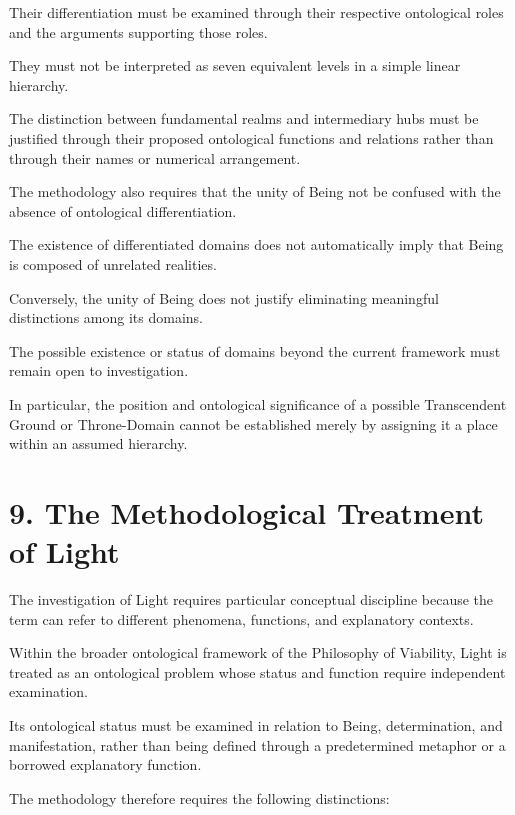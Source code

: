 Their differentiation must be
examined through their respective
ontological roles and the arguments
supporting those roles.

They must not be interpreted
as seven equivalent levels
in a simple linear hierarchy.

The distinction between fundamental
realms and intermediary hubs
must be justified through their
proposed ontological functions
and relations rather than through
their names or numerical arrangement.

The methodology also requires
that the unity of Being not be
confused with the absence of
ontological differentiation.

The existence of differentiated
domains does not automatically
imply that Being is composed
of unrelated realities.

Conversely, the unity of Being
does not justify eliminating
meaningful distinctions among
its domains.

The possible existence or status
of domains beyond the current
framework must remain open
to investigation.

In particular, the position
and ontological significance
of a possible Transcendent Ground
or Throne-Domain cannot be
established merely by assigning
it a place within an assumed
hierarchy.


\section*{9. The Methodological Treatment of Light}

The investigation of Light requires
particular conceptual discipline
because the term can refer to
different phenomena, functions,
and explanatory contexts.

Within the broader ontological
framework of the Philosophy
of Viability, Light is treated
as an ontological problem whose
status and function require
independent examination.

Its ontological status must be
examined in relation to Being,
determination, and manifestation,
rather than being defined through
a predetermined metaphor or
a borrowed explanatory function.

The methodology therefore requires
the following distinctions:

